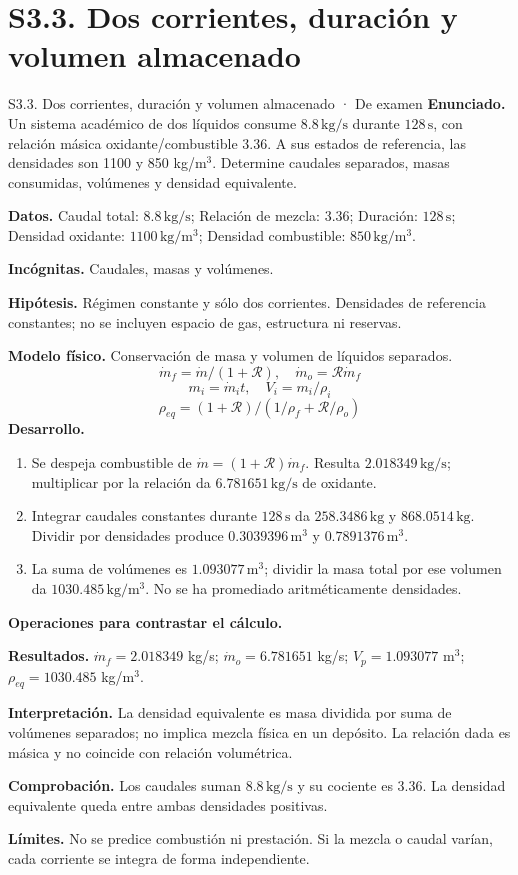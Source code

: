 \section{S3.3. Dos corrientes, duración y volumen almacenado}
\begin{studiumworked}{S3.3. Dos corrientes, duración y volumen almacenado · De examen}
\textbf{Enunciado.} Un sistema académico de dos líquidos consume $8.8\,\mathrm{kg/s}$ durante $128\,\mathrm{s}$, con relación másica oxidante/combustible $3.36$. A sus estados de referencia, las densidades son 1100 y 850 kg/m$^3$. Determine caudales separados, masas consumidas, volúmenes y densidad equivalente.

\textbf{Datos.} Caudal total: $8.8\,\mathrm{kg/s}$; Relación de mezcla: $3.36$; Duración: $128\,\mathrm{s}$; Densidad oxidante: $1100\,\mathrm{kg/m^3}$; Densidad combustible: $850\,\mathrm{kg/m^3}$.

\textbf{Incógnitas.} Caudales, masas y volúmenes.

\textbf{Hipótesis.} Régimen constante y sólo dos corrientes. Densidades de referencia constantes; no se incluyen espacio de gas, estructura ni reservas.

\textbf{Modelo físico.} Conservación de masa y volumen de líquidos separados.
\[\dot m_f=\dot m/(1+\mathcal R),\quad \dot m_o=\mathcal R\dot m_f\]
\[m_i=\dot m_it,\quad V_i=m_i/\rho_i\]
\[\rho_{eq}=(1+\mathcal R)/(1/\rho_f+\mathcal R/\rho_o)\]
\textbf{Desarrollo.}
\begin{enumerate}
\item Se despeja combustible de $\dot m=(1+\mathcal R)\dot m_f$. Resulta $2.018349\,\mathrm{kg/s}$; multiplicar por la relación da $6.781651\,\mathrm{kg/s}$ de oxidante.
\item Integrar caudales constantes durante $128\,\mathrm{s}$ da $258.3486\,\mathrm{kg}$ y $868.0514\,\mathrm{kg}$. Dividir por densidades produce $0.3039396\,\mathrm{m^3}$ y $0.7891376\,\mathrm{m^3}$.
\item La suma de volúmenes es $1.093077\,\mathrm{m^3}$; dividir la masa total por ese volumen da $1030.485\,\mathrm{kg/m^3}$. No se ha promediado aritméticamente densidades.
\end{enumerate}
\textbf{Operaciones para contrastar el cálculo.}

\textbf{Resultados.} $\dot m_f=2.018349$ kg/s; $\dot m_o=6.781651$ kg/s; $V_p=1.093077$ m$^3$; $\rho_{eq}=1030.485$ kg/m$^3$.

\textbf{Interpretación.} La densidad equivalente es masa dividida por suma de volúmenes separados; no implica mezcla física en un depósito. La relación dada es másica y no coincide con relación volumétrica.

\textbf{Comprobación.} Los caudales suman $8.8\,\mathrm{kg/s}$ y su cociente es $3.36$. La densidad equivalente queda entre ambas densidades positivas.

\textbf{Límites.} No se predice combustión ni prestación. Si la mezcla o caudal varían, cada corriente se integra de forma independiente.
\end{studiumworked}
